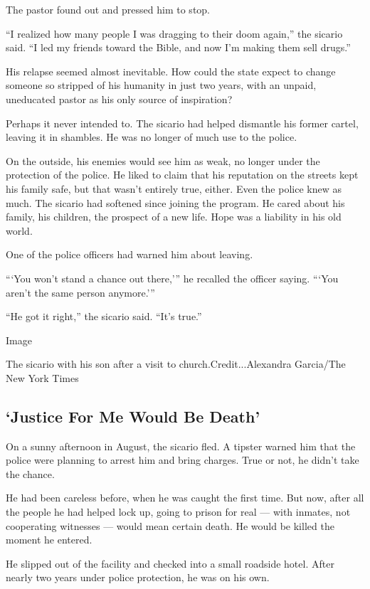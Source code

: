 The pastor found out and pressed him to stop.

``I realized how many people I was dragging to their doom again,'' the
sicario said. ``I led my friends toward the Bible, and now I'm making
them sell drugs.''

His relapse seemed almost inevitable. How could the state expect to
change someone so stripped of his humanity in just two years, with an
unpaid, uneducated pastor as his only source of inspiration?

Perhaps it never intended to. The sicario had helped dismantle his
former cartel, leaving it in shambles. He was no longer of much use to
the police.

On the outside, his enemies would see him as weak, no longer under the
protection of the police. He liked to claim that his reputation on the
streets kept his family safe, but that wasn't entirely true, either.
Even the police knew as much. The sicario had softened since joining the
program. He cared about his family, his children, the prospect of a new
life. Hope was a liability in his old world.

One of the police officers had warned him about leaving.

```You won't stand a chance out there,''' he recalled the officer
saying. ```You aren't the same person anymore.'''

``He got it right,'' the sicario said. ``It's true.''

Image

The sicario with his son after a visit to church.Credit...Alexandra
Garcia/The New York Times

\hypertarget{justice-for-me-would-be-death}{%
\subsection{`Justice For Me Would Be
Death'}\label{justice-for-me-would-be-death}}

On a sunny afternoon in August, the sicario fled. A tipster warned him
that the police were planning to arrest him and bring charges. True or
not, he didn't take the chance.

He had been careless before, when he was caught the first time. But now,
after all the people he had helped lock up, going to prison for real ---
with inmates, not cooperating witnesses --- would mean certain death. He
would be killed the moment he entered.

He slipped out of the facility and checked into a small roadside hotel.
After nearly two years under police protection, he was on his own.

